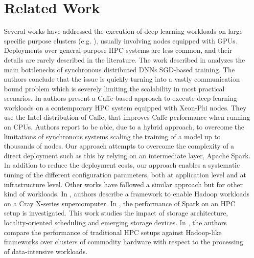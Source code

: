 \documentclass[journal]{IEEEtran}
\begin{document}


\section{Related Work}
\label{sec:rw}

Several works have addressed the execution of deep learning workloads on large specific purpose clusters (e.g. \cite{DBLP:journals/corr/abs-1708-02983}), usually involving nodes equipped with GPUs. Deployments over general-purpose HPC systems are less common, and their details are rarely described in the literature. The work described in \cite{DBLP:conf/sc/KeuperP16} analyzes the main bottlenecks of synchronous distributed DNNs SGD-based training. The authors conclude that the issue is quickly turning into a vastly communication bound problem which is severely limiting the scalability in most practical scenarios. In \cite{DBLP:journals/corr/abs-1708-05256} authors present a Caffe-based approach to execute deep learning workloads on a contemporary HPC system equipped with Xeon-Phi nodes. They use the Intel distribution of Caffe, that improves Caffe performance when running on CPUs. Authors report to be able, due to a hybrid approach, to overcome the limitations of synchronous systems scaling the training of a model up to thousands of nodes. Our approach attempts to overcome the complexity of a direct deployment such as this by relying on an intermediate layer, Apache Spark. In addition to reduce the deployment costs, our approach enables a systematic tuning of the different configuration parameters, both at application level and at infrastructure level. Other works have followed a similar approach but for other kind of workloads. In \cite{michael2014}, authors describe a framework to enable Hadoop workloads on a Cray X-series supercomputer. In \cite{wang2014}, the performance of Spark on an HPC setup is investigated. This work studies the impact of storage architecture, locality-oriented scheduling and emerging storage devices. In \cite{jha2014}, the authors compare the performance of traditional HPC setups against Hadoop-like frameworks over clusters of commodity hardware with respect to the processing of data-intensive workloads. 


\end{document}
